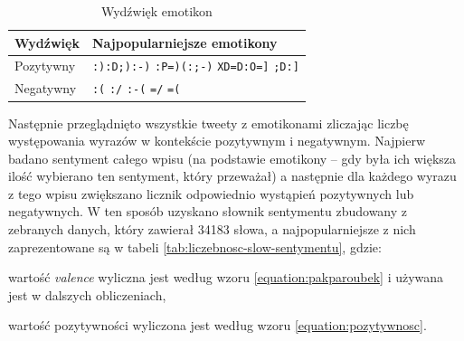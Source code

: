 \begin{table}[ht!]  
\begin{center}  
\begin{tabular}{|l|l|}
\hline
Wydźwięk & Najpopularniejsze emotikony
\\ \hline

Pozytywny & 

\texttt{:)}\quad \texttt{:D}\quad \texttt{;)}\quad \texttt{:-)}\quad 
\texttt{:P}\quad \texttt{=)}\quad \texttt{(:}\quad \texttt{;-)}\quad 
\texttt{XD}\quad \texttt{=D}\quad \texttt{:O}\quad \texttt{=]}\quad 
\texttt{;D}\quad \texttt{:]}\quad 

\\ \hline

Negatywny & 
\texttt{:(} \quad \texttt{:/} \quad \texttt{:-(} \quad \texttt{=/} \quad \texttt{=(}

\\ \hline

\end{tabular} 
\end{center} 
\caption{Wydźwięk emotikon}
\label{tab:wydzwiek-emotikon}
\end{table}

Następnie przeglądnięto wszystkie tweety z emotikonami zliczając liczbę
występowania wyrazów w kontekście pozytywnym i negatywnym.
Najpierw badano sentyment całego wpisu (na podstawie emotikony -- gdy była ich
większa ilość wybierano ten sentyment, który przeważał) a następnie dla każdego
wyrazu z tego wpisu zwiększano licznik odpowiednio wystąpień pozytywnych lub
negatywnych.
W ten sposób uzyskano słownik sentymentu zbudowany z zebranych danych, który
zawierał 34183 słowa, a najpopularniejsze z nich zaprezentowane są w tabeli
\ref{tab:liczebnosc-slow-sentymentu}, gdzie:

wartość \textit{valence} wyliczna jest według wzoru \ref{equation:pakparoubek} 
i używana jest w dalszych obliczeniach,

wartość pozytywności wyliczona jest według wzoru \ref{equation:pozytywnosc}.

